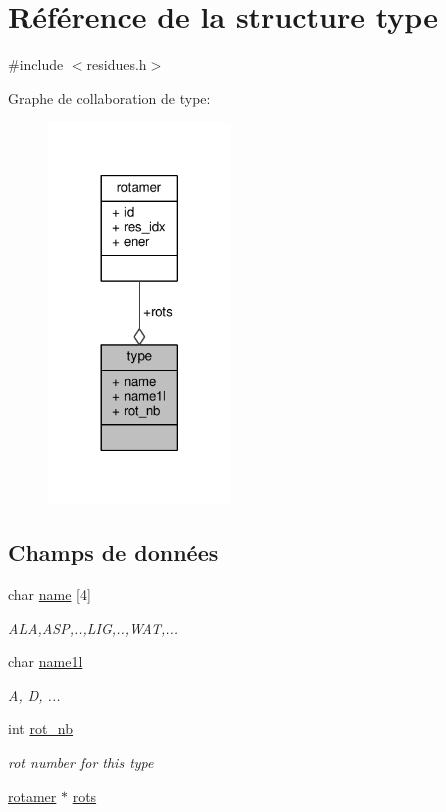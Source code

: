 \hypertarget{structtype}{\section{Référence de la structure type}
\label{structtype}
}


{\ttfamily \#include $<$residues.\+h$>$}



Graphe de collaboration de type\+:\nopagebreak
\begin{figure}[H]
\begin{center}
\leavevmode
\includegraphics[width=137pt]{structtype__coll__graph}
\end{center}
\end{figure}
\subsection*{Champs de données}
\begin{DoxyCompactItemize}
\item 
char \hyperlink{structtype_aa47b79d5b3cf71b3d56a69c115ac1d51}{name} \mbox{[}4\mbox{]}
\begin{DoxyCompactList}\small\item\em A\+L\+A,A\+S\+P,..,L\+I\+G,..,W\+A\+T,... \end{DoxyCompactList}\item 
char \hyperlink{structtype_a98deeb1d3000d9cdb5982023978bdce2}{name1l}
\begin{DoxyCompactList}\small\item\em A, D, ... \end{DoxyCompactList}\item 
int \hyperlink{structtype_affc66df9e7fed7164c85d598352fbef7}{rot\+\_\+nb}
\begin{DoxyCompactList}\small\item\em rot number for this type \end{DoxyCompactList}\item 
\hyperlink{structrotamer}{rotamer} $\ast$ \hyperlink{structtype_a57b235e8311e271142069e1267194adb}{rots}
\end{DoxyCompactItemize}


